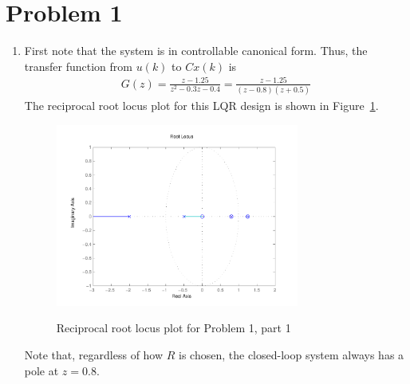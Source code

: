 \section*{Problem 1}

\begin{enumerate}
    \item
    First note that the system is in controllable canonical form. Thus, the transfer function from $u(k)$ to $Cx(k)$ is
    \begin{align*}
        G(z) = \frac{ z - 1.25 }{ z^2 - 0.3 z - 0.4 } 
            = \frac{ z - 1.25 }{ (z - 0.8)(z + 0.5) }
    \end{align*}
    The reciprocal root locus plot for this LQR design is shown in Figure~\ref{fig:finalp1_rl1}.
    \begin{figure}
        \centering
        \includegraphics[width=8cm]{finalp1_rl1}\\
        \caption{Reciprocal root locus plot for Problem 1, part 1}
        \label{fig:finalp1_rl1}
    \end{figure}
    Note that, regardless of how $R$ is chosen, the closed-loop system always has a pole at $z = 0.8$.
    

\end{enumerate}

